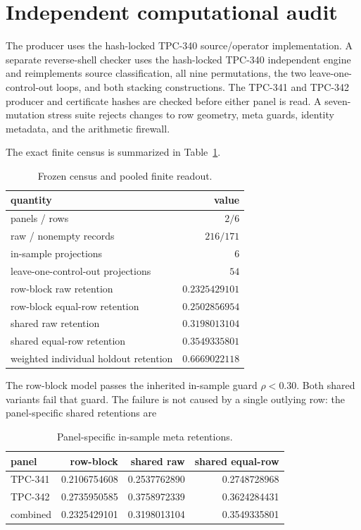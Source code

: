 \documentclass[11pt]{article}
\begin{document}
\section{Independent computational audit}

The producer uses the hash-locked TPC-340 source/operator implementation.  A
separate reverse-shell checker uses the hash-locked TPC-340 independent engine
and reimplements source classification, all nine permutations, the two
leave-one-control-out loops, and both stacking constructions.  The TPC-341 and
TPC-342 producer and certificate hashes are checked before either panel is
read.  A seven-mutation stress suite rejects changes to row geometry, meta
guards, identity metadata, and the arithmetic firewall.

The exact finite census is summarized in Table~\ref{tab:census}.

\begin{table}[ht]
\centering
\caption{Frozen census and pooled finite readout.}
\label{tab:census}
\begin{tabular}{lr}
\toprule
quantity & value\\
\midrule
panels / rows & $2 / 6$\\
raw / nonempty records & $216 / 171$\\
in-sample projections & $6$\\
leave-one-control-out projections & $54$\\
row-block raw retention & $0.2325429101$\\
row-block equal-row retention & $0.2502856954$\\
shared raw retention & $0.3198013104$\\
shared equal-row retention & $0.3549335801$\\
weighted individual holdout retention & $0.6669022118$\\
\bottomrule
\end{tabular}
\end{table}

The row-block model passes the inherited in-sample guard $\rho<0.30$.  Both
shared variants fail that guard.  The failure is not caused by a single
outlying row: the panel-specific shared retentions are

\begin{table}[ht]
\centering
\caption{Panel-specific in-sample meta retentions.}
\label{tab:panels}
\begin{tabular}{lrrr}
\toprule
panel & row-block & shared raw & shared equal-row\\
\midrule
TPC-341 & 0.2106754608 & 0.2537762890 & 0.2748728968\\
TPC-342 & 0.2735950585 & 0.3758972339 & 0.3624284431\\
combined & 0.2325429101 & 0.3198013104 & 0.3549335801\\
\bottomrule
\end{tabular}
\end{table}
\end{document}
